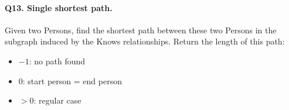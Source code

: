 \paragraph{\textbf{Q13}. Single shortest path.}
Given two Persons, find the shortest path between these two Persons in
the subgraph induced by the Knows relationships.
Return the length of this path:
\begin{itemize}
\tightlist
\item
  \(-1\): no path found
\item
  \(0\): start person = end person
\item
  \(> 0\): regular case
\end{itemize}
